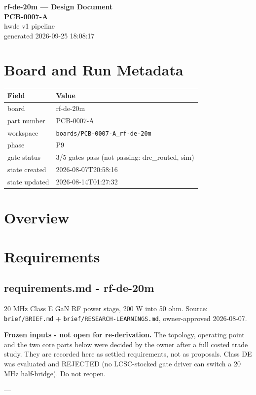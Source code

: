\documentclass[11pt,a4paper]{article}
\begin{document}
\sloppy
\begin{center}
{\LARGE\bfseries rf-de-20m --- Design Document}\\[6pt]
{\Large\bfseries PCB-0007-A}\\[6pt]
{\large hwde v1 pipeline}\\[2pt]
generated 2026-09-25 18:08:17
\end{center}
\tableofcontents

\section{Board and Run Metadata}
{\small
\begin{longtable}{lp{11cm}}
\toprule
\textbf{Field} & \textbf{Value} \\
\midrule
\endhead
board & rf-de-20m \\
part number & PCB-0007-A \\
workspace & \texttt{boards/PCB-0007-A\_rf-de-20m} \\
phase & P9 \\
gate status & 3/5 gates pass (not passing: drc\_routed, sim) \\
state created & 2026-08-07T20:58:16 \\
state updated & 2026-08-14T01:27:32 \\
\bottomrule
\end{longtable}
}
\section{Overview}
\section{Requirements}
\subsection*{requirements.md - rf-de-20m}
20 MHz Class E GaN RF power stage, 200 W into 50 ohm. Source: \texttt{brief/BRIEF.md} + \texttt{brief/RESEARCH-LEARNINGS.md}, owner-approved 2026-08-07.

\textbf{Frozen inputs - not open for re-derivation.} The topology, operating point and the two core parts below were decided by the owner after a full costed trade study. They are recorded here as settled requirements, not as proposals. Class DE was evaluated and REJECTED (no LCSC-stocked gate driver can switch a 20 MHz half-bridge). Do not reopen.

---
\end{document}
